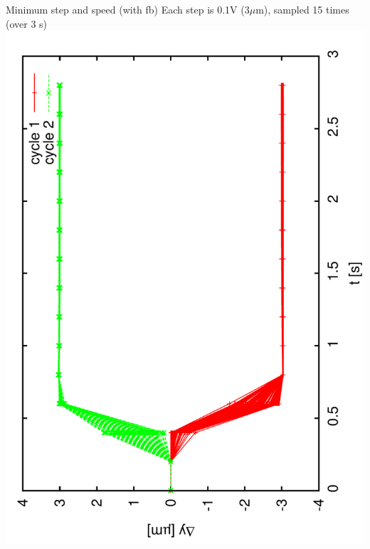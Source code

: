 \documentclass[a4paper,11pt]{book}
\begin{document}
Minimum step and speed (with fb)
Each step is 0.1V (3$\mu$m), sampled 15 times (over 3 s)\\
\includegraphics[angle=-90,scale=0.22]{image04.pdf}
\end{document}
